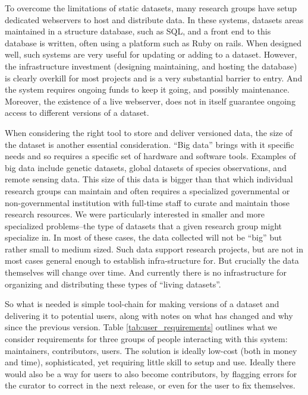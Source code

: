 \documentclass[a4paper,11pt]{article}
\begin{document}
To overcome the limitations of static datasets, many research groups have
setup dedicated webservers to host and distribute data. In these systems,
datasets areas maintained in a structure database, such as SQL, and a front
end to this database is written, often using a platform such as Ruby on rails.
When designed well, such systems are very useful for updating or adding to a
dataset. However, the infrastructure investment (designing maintaining, and
hosting the database) is clearly overkill for most projects and is a very
substantial barrier to entry. And the system requires ongoing funds to keep it
going, and possibly maintenance. Moreover, the existence of a live webserver,
does not in itself guarantee ongoing access to different versions of a
dataset.

When considering the right tool to store and deliver versioned data, the size
of the dataset is another essential consideration. ``Big data'' brings with it
specific needs and so requires a specific set of hardware and software tools.
Examples of big data include genetic datasets, global datasets of species
observations, and remote sensing data. This size of this data is bigger than
that which individual research groups can maintain and often requires a
specialized governmental or non-governmental institution with full-time staff
to curate and maintain those research resources. We were particularly
interested in smaller and more specialized problems--the type of datasets that
a given research group might specialize in. In most of these cases, the data
collected will not be ``big'' but rather small to medium sized. Such data
support research projects, but are not in most cases general enough to
establish infra-structure for. But crucially the data themselves will change
over time. And currently there is no infrastructure for organizing and
distributing these types of ``living datasets''.

So what is needed is simple tool-chain for
making versions of a dataset and delivering it to potential users, along
with notes on what has changed and why since the previous version.
Table \ref{tab:user_requirements} outlines what we consider requirements for
three groups of people interacting with this system: maintainers,
contributors, users. The solution is ideally low-cost (both in money and
time), sophisticated, yet requiring little skill to setup and use.  Ideally
there would also be a way for users to also become contributors, by flagging
errors for the curator to correct in the next release, or even for the user to
fix themselves.
\end{document}
